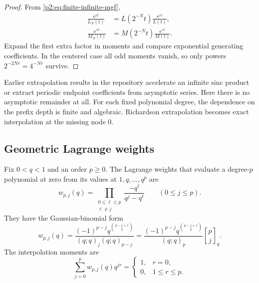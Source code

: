 \documentclass[11pt,oneside]{article}
\numberwithin{equation}{section}
\theoremstyle{definition}
\theoremstyle{remark}
\newcommand{\e}{\mathrm e}
\newcommand{\qbinom}[3]{\genfrac{[}{]}{0pt}{}{#1}{#2}_{#3}}
\begin{document}
\begin{proof}
From \eqref{p2:eq:finite-infinite-mgf},
\begin{align*}
 \frac{\e^{xt}}{L_N(t)}
 &=L(2^{-N}t)\frac{\e^{xt}}{L(t)},\\
 \frac{\e^{xt}}{M_N(t)}
 &=M(2^{-N}t)\frac{\e^{xt}}{M(t)}.
\end{align*}
Expand the first extra factor in moments and compare exponential generating coefficients.  In the
centered case all odd moments vanish, so only powers $2^{-2Nr}=4^{-Nr}$ survive.
\end{proof}

\begin{remark}
Earlier extrapolation results in the repository accelerate an infinite sinc product or extract
periodic endpoint coefficients from asymptotic series.  Here there is no asymptotic remainder at
all.  For each fixed polynomial degree, the dependence on the prefix depth is finite and algebraic.
Richardson extrapolation becomes exact interpolation at the missing node $0$.
\end{remark}

\subsection{Geometric Lagrange weights}

Fix $0<q<1$ and an order $p\ge0$.  The Lagrange weights that evaluate a degree-$p$ polynomial at
zero from its values at $1,q,\ldots,q^p$ are
\begin{equation}
 w_{p,j}(q)
 =\prod_{\substack{0\le\ell\le p\\\ell\ne j}}
 \frac{-q^\ell}{q^j-q^\ell}
 \qquad(0\le j\le p).
 \label{p2:eq:w-Lagrange}
\end{equation}
They have the Gaussian-binomial form
\begin{equation}
 \boxed{
 w_{p,j}(q)
 =\frac{(-1)^{p-j}q^{\binom{p-j+1}{2}}}
 {(q;q)_j(q;q)_{p-j}}
 =\frac{(-1)^{p-j}q^{\binom{p-j+1}{2}}}{(q;q)_p}
 \qbinom pj q.
 }
 \label{p2:eq:w-qbinomial}
\end{equation}
The interpolation moments are
\begin{equation}
 \sum_{j=0}^{p}w_{p,j}(q)q^{jr}
 =\begin{cases}
 1,&r=0,\\
 0,&1\le r\le p.
 \end{cases}
 \label{p2:eq:w-annihilation}
\end{equation}
\end{document}
